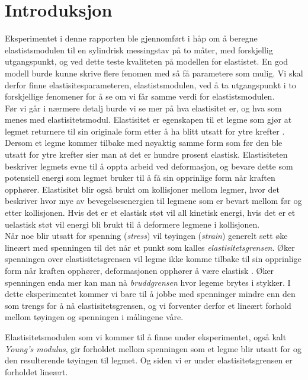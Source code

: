 \documentclass[%
 reprint,
 amsmath,amssymb,
 aps,
 norsk,
 booktabs
]{revtex4-1}
\begin{document}
\section{Introduksjon}
Eksperimentet i denne rapporten ble gjennomført i håp om å beregne elastistsmodulen til en sylindrisk messingstav på to måter, med forskjellig utgangspunkt, og ved dette teste kvaliteten på modellen for elastistet. En god modell burde kunne skrive flere fenomen med så få parametere som mulig. Vi skal derfor finne elastisitesparameteren, elastistsmodulen, ved å ta utgangspunkt i to forskjellige fenomener for å se om vi får samme verdi for elastistsmodulen.\\
Før vi går i nærmere detalj burde vi se mer på hva elastisitet er, og hva som menes med elastisitetsmodul. Elastisitet er egenskapen til et legme som gjør at legmet returnere til sin originale form etter å ha blitt utsatt  for ytre krefter \cite{gronn}. Dersom et legme kommer tilbake med nøyaktig samme form som før den ble utsatt for ytre krefter sier man at det er hundre prosent elastisk. Elastisiteten beskriver legmets evne til å oppta arbeid ved deformasjon, og bevare dette som potensiell energi som legmet bruker til å få sin opprinlige form når kraften opphører. Elastisitet blir også brukt om kollisjoner mellom legmer, hvor det beskriver hvor mye av bevegelsesenergien til legmene som er bevart mellom før og etter kollisjonen. Hvis det er et elastisk støt vil all kinetisk energi, hvis det er et uelastisk støt vil energi bli brukt til å deformere legmene i kollisjonen.\\

Når noe blir utsatt for spenning (\textit{stress}) vil tøyingen (\textit{strain}) generelt sett øke lineært med spenningen til det når et punkt som kalles \textit{elastisitetsgrensen}. Øker spenningen over elastisitetsgrensen vil legme ikke komme tilbake til sin opprinlige form når kraften opphører, deformasjonen opphører å være elastisk  \cite{gronn}. Øker spenningen enda mer kan man nå \textit{bruddgrensen} hvor legeme brytes i stykker. I dette eksperimentet kommer vi bare til å jobbe med spenninger mindre enn den som trengs for å nå elastisitetsgrensen, og vi forventer derfor et lineært forhold mellom tøyingen og spenningen i målingene våre.

Elastisitetsmodulen som vi kommer til å finne under eksperimentet, også kalt \textit{Young's modulus}, gir forholdet mellom spenningen som et legme blir utsatt for og den resulterende tøyingen til legmet. Og siden vi er under elastisitetsgrensen er forholdet lineært.
\end{document}
